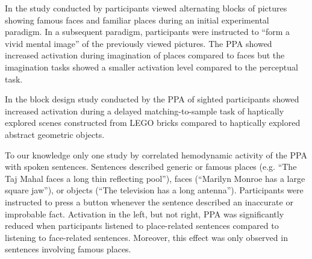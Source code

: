 \documentclass[english]{article}
\begin{document}
In the study conducted by \citep{ocraven2000mental} participants viewed
alternating blocks of pictures showing famous faces and familiar places during
an initial experimental paradigm. In a subsequent paradigm, participants were
instructed to ``form a vivid mental image'' of the previously viewed pictures.
The PPA showed increased activation during imagination of places compared to
faces but the imagination tasks showed a smaller activation level compared to
the perceptual task.

In the block design study conducted by \citep{wolbers2011modality} the PPA of
sighted participants showed increased activation during a delayed
matching-to-sample task of haptically explored scenes constructed from LEGO
bricks compared to haptically explored abstract geometric objects.




To our knowledge only one study by \citep{aziz2008modulation} correlated
hemodynamic activity of the PPA with spoken sentences. Sentences described
generic or famous places (e.g. ``The Taj Mahal faces a long thin reflecting
pool''), faces  (``Marilyn Monroe has a large square jaw''), or objects (``The
television has a long antenna'').
Participants were instructed to press a button whenever the sentence described
an inaccurate or improbable fact.
Activation in the left, but not right, PPA was significantly reduced when
participants listened to place-related sentences compared to listening to
face-related sentences. Moreover, this effect was only observed in sentences
involving famous places.
\end{document}
